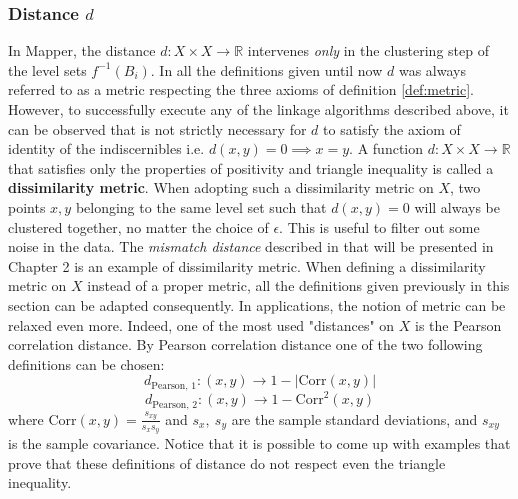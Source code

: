 \subsubsection{Distance $d$}
In Mapper, the distance $d : X \times X \rightarrow \mathbb{R}$ intervenes \textit{only} in the clustering step of the level sets $f^{-1}(B_i)$. In all the definitions given until now $d$ was always referred to as a metric respecting the three axioms of definition \ref{def:metric}. However, to successfully execute any of the linkage algorithms described above, it can be observed that is not strictly necessary for $d$ to satisfy the axiom of identity of the indiscernibles i.e. $d(x,y)=0 \implies x=y$. A function $d:X\times X \rightarrow\mathbb{R}$ that satisfies only the properties of positivity and triangle inequality is called a \textbf{dissimilarity metric}. When adopting such a dissimilarity metric on $X$, two points $x,y$ belonging to the same level set such that $d(x,y)=0$ will always be clustered together, no matter the choice of $\epsilon$. This is useful to filter out some noise in the data. The \textit{mismatch distance} described in \cite{TwoTierMapper} that will be presented in Chapter 2 is an example of dissimilarity metric. When defining a dissimilarity metric on $X$ instead of a proper metric, all the definitions given previously in this section can be adapted consequently. \newline
In applications, the notion of metric can be relaxed even more. Indeed, one of the most used "distances" on $X$ is the Pearson correlation distance. By Pearson correlation distance one of the two following definitions can be chosen:
\begin{equation*}
d_{\text{Pearson, 1}} : (x,y)\rightarrow1-|\text{Corr}(x,y)|
\end{equation*}
\begin{equation*}
d_{\text{Pearson, 2}} : (x,y)\rightarrow1-\text{Corr}^2(x,y)
\end{equation*}
where $\text{Corr}(x,y)=\frac{s_{xy}}{s_xs_y}$ and $s_x,\ s_y$ are the sample standard deviations, and $s_{xy}$ is the sample covariance.
Notice that it is possible to come up with examples that prove that these definitions of distance do not respect even the triangle inequality.\newline




















